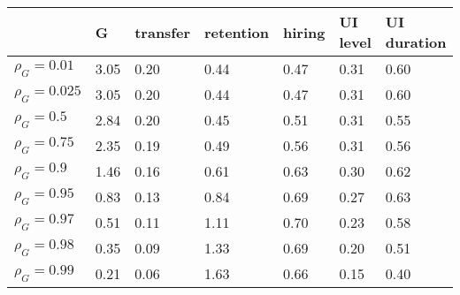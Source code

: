 \begin{tabular}{lllllll}
\toprule
 & \textbf{G} & \textbf{transfer} & \textbf{retention} & \textbf{hiring} & \textbf{UI level} & \textbf{UI duration} \\
\midrule
$\rho_G = 0.01$ & 3.05 & 0.20 & 0.44 & 0.47 & 0.31 & 0.60 \\
$\rho_G = 0.025$ & 3.05 & 0.20 & 0.44 & 0.47 & 0.31 & 0.60 \\
$\rho_G = 0.5$ & 2.84 & 0.20 & 0.45 & 0.51 & 0.31 & 0.55 \\
$\rho_G = 0.75$ & 2.35 & 0.19 & 0.49 & 0.56 & 0.31 & 0.56 \\
$\rho_G = 0.9$ & 1.46 & 0.16 & 0.61 & 0.63 & 0.30 & 0.62 \\
$\rho_G = 0.95$ & 0.83 & 0.13 & 0.84 & 0.69 & 0.27 & 0.63 \\
$\rho_G = 0.97$ & 0.51 & 0.11 & 1.11 & 0.70 & 0.23 & 0.58 \\
$\rho_G = 0.98$ & 0.35 & 0.09 & 1.33 & 0.69 & 0.20 & 0.51 \\
$\rho_G = 0.99$ & 0.21 & 0.06 & 1.63 & 0.66 & 0.15 & 0.40 \\
\bottomrule
\end{tabular}
